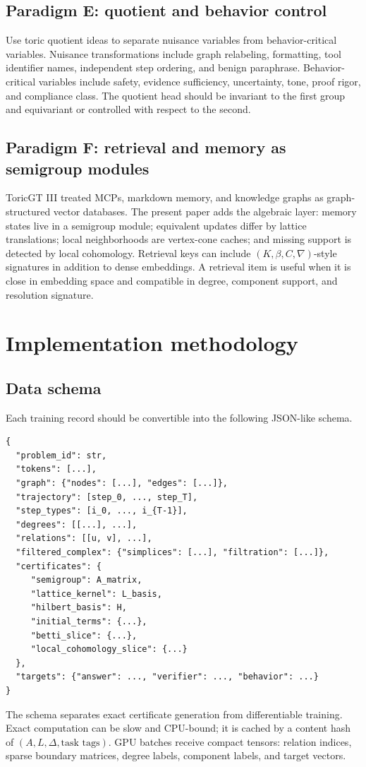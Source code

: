 \documentclass[11pt]{article}
\theoremstyle{definition}
\begin{document}
\subsection{Paradigm E: quotient and behavior control}
Use toric quotient ideas to separate nuisance variables from behavior-critical variables.  Nuisance transformations include graph relabeling, formatting, tool identifier names, independent step ordering, and benign paraphrase.  Behavior-critical variables include safety, evidence sufficiency, uncertainty, tone, proof rigor, and compliance class.  The quotient head should be invariant to the first group and equivariant or controlled with respect to the second.

\subsection{Paradigm F: retrieval and memory as semigroup modules}
ToricGT III treated MCPs, markdown memory, and knowledge graphs as graph-structured vector databases.  The present paper adds the algebraic layer: memory states live in a semigroup module; equivalent updates differ by lattice translations; local neighborhoods are vertex-cone caches; and missing support is detected by local cohomology.  Retrieval keys can include \((K,\beta,C,\nabla)\)-style signatures in addition to dense embeddings.  A retrieval item is useful when it is close in embedding space and compatible in degree, component support, and resolution signature.

\section{Implementation methodology}
\subsection{Data schema}
Each training record should be convertible into the following JSON-like schema.
\begin{verbatim}
{
  "problem_id": str,
  "tokens": [...],
  "graph": {"nodes": [...], "edges": [...]},
  "trajectory": [step_0, ..., step_T],
  "step_types": [i_0, ..., i_{T-1}],
  "degrees": [[...], ...],
  "relations": [[u, v], ...],
  "filtered_complex": {"simplices": [...], "filtration": [...]},
  "certificates": {
     "semigroup": A_matrix,
     "lattice_kernel": L_basis,
     "hilbert_basis": H,
     "initial_terms": {...},
     "betti_slice": {...},
     "local_cohomology_slice": {...}
  },
  "targets": {"answer": ..., "verifier": ..., "behavior": ...}
}
\end{verbatim}
The schema separates exact certificate generation from differentiable training.  Exact computation can be slow and CPU-bound; it is cached by a content hash of \((A,L,\Delta,\text{task tags})\).  GPU batches receive compact tensors: relation indices, sparse boundary matrices, degree labels, component labels, and target vectors.
\end{document}
